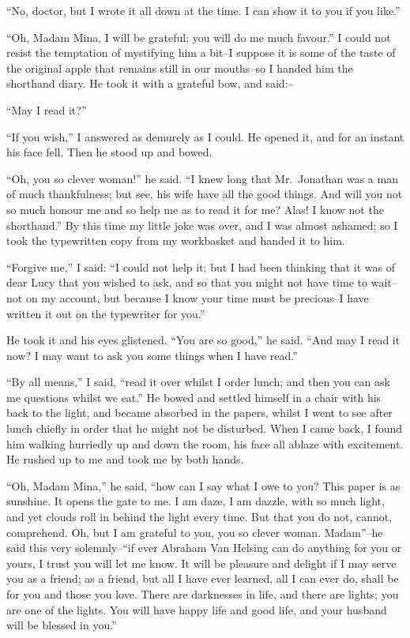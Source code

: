 \documentclass[12pt,openright]{book}
\begin{document}
“No, doctor, but I wrote it all down at the time. I can show it to you if you like.”

“Oh, Madam Mina, I will be grateful; you will do me much favour.” I could not resist the temptation of mystifying him a bit–I suppose it is some of the taste of the original apple that remains still in our mouths–so I handed him the shorthand diary. He took it with a grateful bow, and said:–

“May I read it?”

“If you wish,” I answered as demurely as I could. He opened it, and for an instant his face fell. Then he stood up and bowed.

“Oh, you so clever woman!” he said. “I knew long that Mr. Jonathan was a man of much thankfulness; but see, his wife have all the good things. And will you not so much honour me and so help me as to read it for me? Alas! I know not the shorthand.” By this time my little joke was over, and I was almost ashamed; so I took the typewritten copy from my workbasket and handed it to him.

“Forgive me,” I said: “I could not help it; but I had been thinking that it was of dear Lucy that you wished to ask, and so that you might not have time to wait–not on my account, but because I know your time must be precious–I have written it out on the typewriter for you.”

He took it and his eyes glistened. “You are so good,” he said. “And may I read it now? I may want to ask you some things when I have read.”

“By all means,” I said, “read it over whilst I order lunch; and then you can ask me questions whilst we eat.” He bowed and settled himself in a chair with his back to the light, and became absorbed in the papers, whilst I went to see after lunch chiefly in order that he might not be disturbed. When I came back, I found him walking hurriedly up and down the room, his face all ablaze with excitement. He rushed up to me and took me by both hands.

“Oh, Madam Mina,” he said, “how can I say what I owe to you? This paper is as sunshine. It opens the gate to me. I am daze, I am dazzle, with so much light, and yet clouds roll in behind the light every time. But that you do not, cannot, comprehend. Oh, but I am grateful to you, you so clever woman. Madam”–he said this very solemnly–“if ever Abraham Van Helsing can do anything for you or yours, I trust you will let me know. It will be pleasure and delight if I may serve you as a friend; as a friend, but all I have ever learned, all I can ever do, shall be for you and those you love. There are darknesses in life, and there are lights; you are one of the lights. You will have happy life and good life, and your husband will be blessed in you.”
\end{document}
